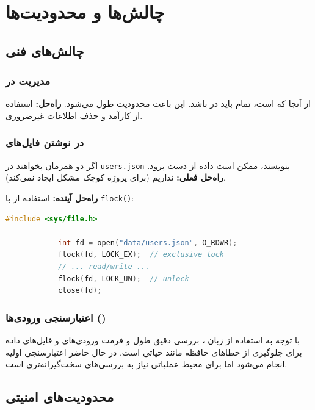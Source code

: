 \documentclass[12pt,a4paper]{article}
\begin{document}
	
	
	\newpage
	\section{چالش‌ها و محدودیت‌ها}
	
	\subsection{چالش‌های فنی}
	
	\subsubsection{مدیریت  در }
	از آنجا که   است، تمام  باید در  باشد.
	این باعث محدودیت طول  می‌شود.
	\textbf{راه‌حل:} استفاده از  کارآمد و حذف اطلاعات غیرضروری.
	
	\subsubsection{ در نوشتن فایل‌های }
	اگر دو  همزمان بخواهند در \texttt{users.json} بنویسند، ممکن است داده از دست برود.
	\textbf{راه‌حل فعلی:} نداریم (برای پروژه کوچک مشکل ایجاد نمی‌کند).
	
	\textbf{راه‌حل آینده:} استفاده از  با \texttt{flock()}:
	
	\begin{latin}
		\begin{lstlisting}[language=C, caption=File locking]
			#include <sys/file.h>
			
			int fd = open("data/users.json", O_RDWR);
			flock(fd, LOCK_EX);  // exclusive lock
			// ... read/write ...
			flock(fd, LOCK_UN);  // unlock
			close(fd);
		\end{lstlisting}
	\end{latin}
	
	\subsubsection{اعتبارسنجی ورودی‌ها ()}
	با توجه به استفاده از زبان ، بررسی دقیق طول و فرمت ورودی‌های  و فایل‌های داده برای جلوگیری از خطاهای حافظه مانند  حیاتی است. در حال حاضر اعتبارسنجی اولیه انجام می‌شود اما برای محیط عملیاتی نیاز به بررسی‌های سخت‌گیرانه‌تری است.
	
	\subsection{محدودیت‌های امنیتی}
	
\end{document}
